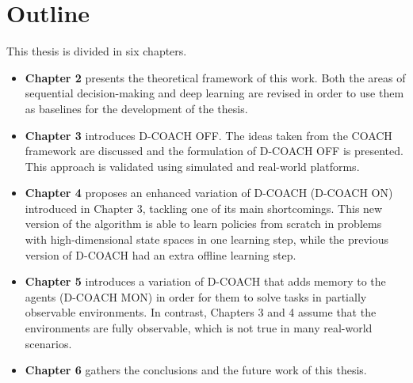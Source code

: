 \section{Outline}
This thesis is divided in six chapters.

\begin{itemize}
    \item \textbf{Chapter 2} presents the theoretical framework of this work. Both the areas of sequential decision-making and deep learning are revised in order to use them as baselines for the development of the thesis.
    \item \textbf{Chapter 3} introduces D-COACH OFF. The ideas taken from the COACH framework are discussed and the formulation of D-COACH OFF is presented. This approach is validated using simulated and real-world platforms.
    \item \textbf{Chapter 4} proposes an enhanced variation of D-COACH (D-COACH ON) introduced in Chapter 3, tackling one of its main shortcomings. This new version of the algorithm is able to learn policies from scratch in problems with high-dimensional state spaces in one learning step, while the previous version of D-COACH had an extra offline learning step.
    \item \textbf{Chapter 5} introduces a variation of D-COACH that adds memory to the agents ($\text{D-COACH}$ MON) in order for them to solve tasks in partially observable environments. In contrast, Chapters 3 and 4 assume that the environments are fully observable, which is not true in many real-world scenarios.
    \item \textbf{Chapter 6} gathers the conclusions and the future work of this thesis.
\end{itemize}
